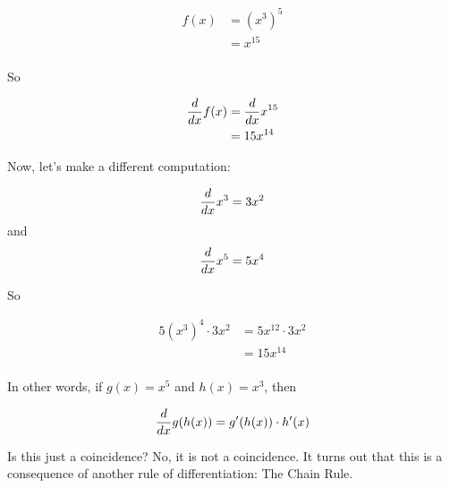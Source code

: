 \documentclass{ximera}
\begin{document}
\begin{align*}
f(x) &= (x^{3})^{5}\\ 
&=x^{15} \\
\end{align*}

So

\begin{align*}
\frac{d}{\mathop{}\!d x} f(x) &= \frac{d}{\mathop{}\!d x} x^{15}\\ 
&=15x^{14} \\
\end{align*}

Now, let's make a different computation:

$$\frac{d}{\mathop{}\!d x} x^{3} = 3x^{2}$$
and
$$\frac{d}{\mathop{}\!d x} x^{5} = 5x^{4}$$ 

So

\begin{align*}
5(x^{3})^{4} \cdot  3x^{2} &= 5x^{12} \cdot 3x^{2}\\ 
&=15x^{14} \\
\end{align*}

In other words, if $g(x)=x^{5}$ and $h(x)=x^{3}$, then

$$\frac{d}{\mathop{}\!d x} g(h(x))=g'(h(x)) \cdot h'(x)$$

Is this just a coincidence? No, it is not a coincidence. It turns out that this is a consequence of another rule of differentiation: The Chain Rule.

\end{document}

